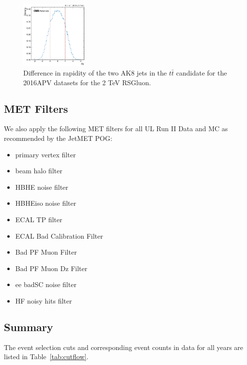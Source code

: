 \begin{figure}[htp]
	\begin{center}
		\includegraphics[width=0.3\textwidth]{Plots/kinematics/delta_rapidity.png}
		\caption{Difference in rapidity of the two AK8 jets in the $t\bar{t}$ candidate for the 2016APV datasets for the 2 TeV RSGluon.}
		\label{fig:jety}
	\end{center}
\end{figure}

\subsection{MET Filters}

We also apply the following MET filters for all UL Run II Data and MC as recommended by the JetMET POG:

\begin{itemize}
	\item {primary vertex filter}
	\item {beam halo filter}
	\item {HBHE noise filter}
	\item {HBHEiso noise filter}
	\item {ECAL TP filter}
	\item {ECAL Bad Calibration Filter}
	\item {Bad PF Muon Filter}
	\item {Bad PF Muon Dz Filter}
	\item {ee badSC noise filter}
	\item {HF noisy hits filter}
	
\end{itemize}


\subsection{Summary}


The event selection cuts and corresponding event counts in data for all years are listed in Table~\ref{tab:cutflow}.

